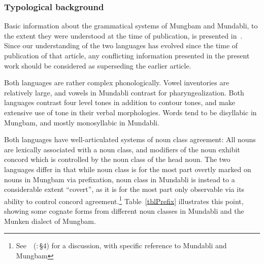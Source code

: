 \documentclass[10pt,twoside]{article}
\newcommand{\citepage}[2]{\citeauthor{#1}~{(\citeyear{#1}:\,{#2})}}
\begin{document}
\subsubsection{Typological background}\label{secTypological}
Basic information about the grammatical systems of Mungbam and Mundabli,
to the extent they were understood at the time of publication, is presented
in~\cite{good:inprep}. Since our understanding of the two languages has evolved
since the time of publication of that article, any conflicting information
presented in the present work should be considered as superseding the
earlier article.

Both languages are rather complex phonologically. Vowel inventories
are relatively large, and vowels in Mundabli contrast for pharyngealization.
Both languages contrast four level tones in addition to
contour tones, and make extensive use of tone in their verbal
morphologies. Words tend to be disyllabic in Mungbam, and mostly
monosyllabic in Mundabli.

Both languages have well-articulated systems of noun class agreement:
All nouns are lexically associated with a noun class, 
and modifiers of the noun exhibit concord
which is controlled by the noun class of the head noun.
The two languages differ in that while noun class is for the
most part overtly marked on nouns in Mungbam via prefixation,
noun class in Mundabli is instead to a considerable extent
``covert'', as it is for the most part only observable via
its ability to control concord agreement.\footnote{See~\citepage{good:kwanoun}{\S4}
for a discussion, with specific reference to Mundabli and Mungbam}
Table~\ref{tblPrefix} illustrates this point, showing some cognate
forms from different noun classes in Mundabli and the Munken
dialect of Mungbam. 
\end{document}
